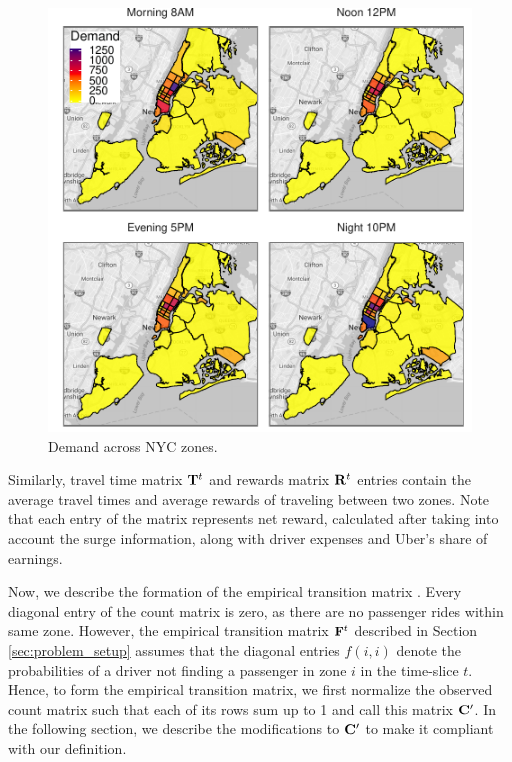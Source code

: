 \begin{figure}
	\centering
	\includegraphics{figures/demand_heatmap.pdf}
	\caption{Demand across NYC zones.}
	\label{fig:demand_heatmap}
\end{figure}

Similarly, travel time matrix ${\mathbf{T}}^t$ and rewards matrix ${\mathbf{R}}^t$ entries contain the average travel times and average rewards of traveling between two zones. Note that each entry of the {\rewardsmatrix} matrix represents net reward, calculated after taking into account the surge information, along with driver expenses and Uber's share of earnings.

Now, we describe the formation of the empirical transition matrix {\empiricaltransitionmatrix}. Every diagonal entry of the count matrix {\countmatrix} is zero, as there are no passenger rides within same zone. However, the empirical transition matrix {${\mathbf{F}}^t$} described in Section \ref{sec:problem_setup} assumes that the diagonal entries $f(i,i)$ denote the probabilities of a driver not finding a passenger in zone $i$ in the time-slice $t$. Hence, to form the empirical transition matrix, we first normalize the observed count matrix such that each of its rows sum up to 1 and call this matrix ${\mathbf{C}}^\prime$. In the following section, we describe the modifications to ${\mathbf{C}}^\prime$ to make it compliant with our definition.


